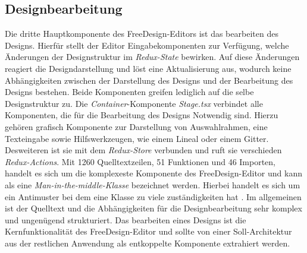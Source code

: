 \subsection{Designbearbeitung}
Die dritte Hauptkomponente des FreeDesign-Editors ist das bearbeiten des Designs. Hierfür stellt der Editor Eingabekomponenten zur Verfügung, welche Änderungen der Designstruktur im \textit{Redux-State} bewirken. Auf diese Änderungen reagiert die Designdarstellung und löst eine Aktualisierung aus, wodurch keine Abhängigkeiten zwischen der Darstellung des Designs und der Bearbeitung des Designs bestehen. Beide Komponenten greifen lediglich auf die selbe Designstruktur zu.  
Die \textit{Container}-Komponente \textit{Stage.tsx} verbindet alle Komponenten, die für die Bearbeitung des Designs Notwendig sind. Hierzu gehören grafisch Komponente zur Darstellung von Auswahlrahmen, eine Texteingabe sowie Hilfswerkzeugen, wie einem Lineal oder einem Gitter. 
Desweiteren ist sie mit dem \textit{Redux-Store} verbunden und ruft sie verschieden \textit{Redux-Actions}. 
Mit  1260 Quelltextzeilen, 51 Funktionen und 46 Importen, handelt es sich um die komplexeste Komponente des FreeDesign-Editor und kann als eine \textit{Man-in-the-middle-Klasse} bezeichnet werden. Hierbei handelt es sich um ein Antimuster bei dem eine Klasse zu viele zuständigkeiten hat \autocite[vgl.][619]{Geirhos2015}.
Im allgemeinen ist der Quelltext und die Abhängigkeiten für die Designbearbeitung sehr komplex und ungenügend strukturiert. Das bearbeiten eines Designs ist die Kernfunktionalität des FreeDesign-Editor und sollte von einer Soll-Architektur aus der restlichen Anwendung als entkoppelte Komponente extrahiert werden. 

\begin{multicols}{2}    
    
\end{multicols}
